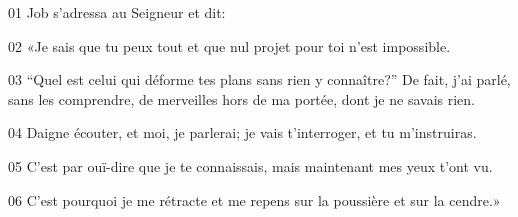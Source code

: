 01 Job s’adressa au Seigneur et dit:

02 «Je sais que tu peux tout et que nul projet pour toi n’est impossible.

03 “Quel est celui qui déforme tes plans sans rien y connaître?” De fait, j’ai parlé, sans les comprendre, de merveilles hors de ma portée, dont je ne savais rien.

04 Daigne écouter, et moi, je parlerai; je vais t’interroger, et tu m’instruiras.

05 C’est par ouï-dire que je te connaissais, mais maintenant mes yeux t’ont vu.

06 C’est pourquoi je me rétracte et me repens sur la poussière et sur la cendre.»